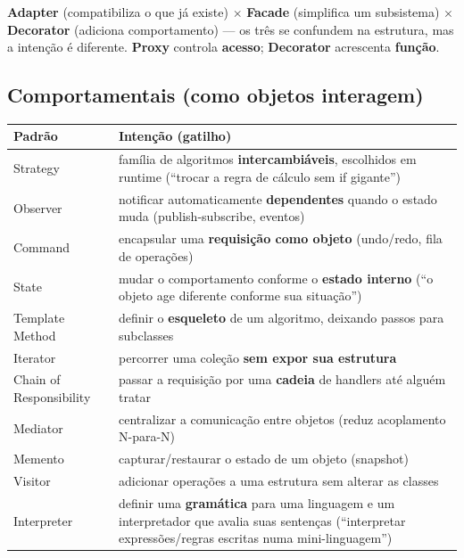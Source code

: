 \begin{pegadinha}
\textbf{Adapter} (compatibiliza o que já existe) $\times$ \textbf{Facade}
(simplifica um subsistema) $\times$ \textbf{Decorator} (adiciona
comportamento) --- os três se confundem na estrutura, mas a intenção é
diferente. \textbf{Proxy} controla \textbf{acesso}; \textbf{Decorator}
acrescenta \textbf{função}.
\end{pegadinha}

\subsection{Comportamentais (como objetos interagem)}

\begin{center}
\begin{tabular}{@{}p{2.8cm}p{9cm}@{}}
\toprule
\textbf{Padrão} & \textbf{Intenção (gatilho)} \\
\midrule
Strategy & família de algoritmos \textbf{intercambiáveis}, escolhidos em runtime (``trocar a regra de cálculo sem if gigante'') \\
Observer & notificar automaticamente \textbf{dependentes} quando o estado muda (publish-subscribe, eventos) \\
Command & encapsular uma \textbf{requisição como objeto} (undo/redo, fila de operações) \\
State & mudar o comportamento conforme o \textbf{estado interno} (``o objeto age diferente conforme sua situação'') \\
Template Method & definir o \textbf{esqueleto} de um algoritmo, deixando passos para subclasses \\
Iterator & percorrer uma coleção \textbf{sem expor sua estrutura} \\
Chain of Responsibility & passar a requisição por uma \textbf{cadeia} de handlers até alguém tratar \\
Mediator & centralizar a comunicação entre objetos (reduz acoplamento N-para-N) \\
Memento & capturar/restaurar o estado de um objeto (snapshot) \\
Visitor & adicionar operações a uma estrutura sem alterar as classes \\
Interpreter & definir uma \textbf{gramática} para uma linguagem e um interpretador que avalia suas sentenças (``interpretar expressões/regras escritas numa mini-linguagem'') \\
\bottomrule
\end{tabular}
\end{center}

